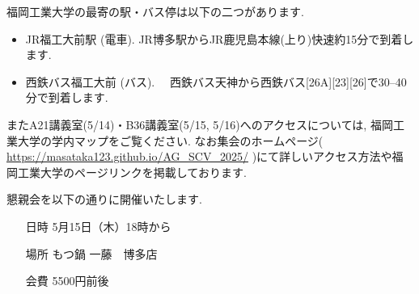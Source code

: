 \documentclass[dvipdfmx,a4paper,12pt]{article}
\theoremstyle{plain} %
\theoremstyle{definition} %
\begin{document}
  

福岡工業大学の最寄の駅・バス停は以下の二つがあります.
\begin{itemize}
  \setlength{\parskip}{0cm} 
  \setlength{\itemsep}{0cm}
\item JR福工大前駅 (電車).  JR博多駅からJR鹿児島本線(上り)快速約15分で到着します.
\item 西鉄バス福工大前 (バス). 　西鉄バス天神から西鉄バス[26A][23][26]で30--40分で到着します.
\end{itemize}

またA21講義室(5/14)・B36講義室(5/15, 5/16)へのアクセスについては, 福岡工業大学の学内マップをご覧ください. 
なお集会のホームページ( \url{https://masataka123.github.io/AG_SCV_2025/} )にて詳しいアクセス方法や福岡工業大学のページリンクを掲載しております. 

  \vskip5mm
  
  
 

懇親会を以下の通りに開催いたします.
\begin{itemize}
  \setlength{\parskip}{0cm} 
  \setlength{\itemsep}{0cm}
\item[日時] 5月15日（木）18時から
\item[場所] もつ鍋 一藤　博多店
\item[会費] 5500円前後 
  \end{itemize}
  
\end{document}
